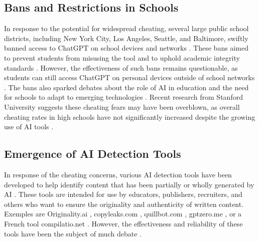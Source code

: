\documentclass{article}
\begin{document}
\subsection{Bans and Restrictions in Schools}
In response to the potential for widespread cheating, several large public school districts, including New York City, Los Angeles, Seattle, and Baltimore, swiftly banned access to ChatGPT on school devices and networks \cite{https://oai.missouri.edu/chatgpt-artificial-intelligence-and-academic-integrity/} \cite{https://www.reddit.com/r/changemyview/comments/123m3xr/cmv_using_chatgpt_for_academic_purposes_is_not_an/}. These bans aimed to prevent students from misusing the tool and to uphold academic integrity standards \cite{https://oai.missouri.edu/chatgpt-artificial-intelligence-and-academic-integrity/}.
However, the effectiveness of such bans remains questionable, as students can still access ChatGPT on personal devices outside of school networks \cite{https://www.reddit.com/r/changemyview/comments/123m3xr/cmv_using_chatgpt_for_academic_purposes_is_not_an/}. The bans also sparked debates about the role of AI in education and the need for schools to adapt to emerging technologies \cite{https://oai.missouri.edu/chatgpt-artificial-intelligence-and-academic-integrity/} \cite{https://www.reddit.com/r/changemyview/comments/123m3xr/cmv_using_chatgpt_for_academic_purposes_is_not_an/}.
Recent research from Stanford University suggests these cheating fears may have been overblown, as overall cheating rates in high schools have not significantly increased despite the growing use of AI tools \cite{https://www.nytimes.com/2023/12/13/technology/chatbot-cheating-schools-students.html}.
\subsection{Emergence of AI Detection Tools}
In response of the cheating concerns, various AI detection tools have been developed to help identify content that has been partially or wholly generated by AI \cite{https://kb.iu.edu/d/bimt}. These tools are intended for use by educators, publishers, recruiters, and others who want to ensure the originality and authenticity of written content. Exemples are Originality.ai \cite{https://originality.ai/}, copyleaks.com \cite{https://copyleaks.com}, quillbot.com \cite{https://quillbot.com/}, gptzero.me \cite{https://gptzero.me/}, or a French tool compilatio.net \cite{https://www.compilatio.net/ia-detecteur-info}. However, the effectiveness and reliability of these tools have been the subject of much debate \cite{https://www.scribbr.com/ai-tools/how-do-ai-detectors-work/} \cite{https://contadu.com/ai-detection-tools-the-challenge-of-todays-digital-age/} \cite{https://edintegrity.biomedcentral.com/articles/10.1007/s40979-023-00140-5}.
\end{document}
